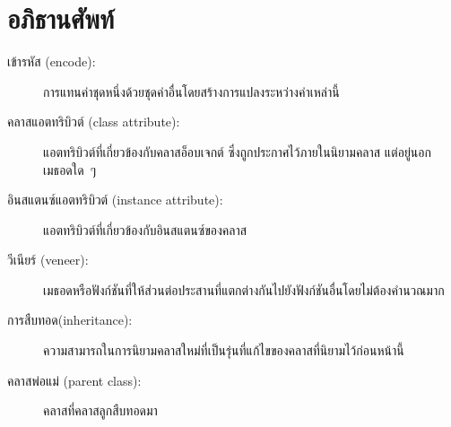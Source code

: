 \section{อภิธานศัพท์}

\begin{description}


\item[เข้ารหัส (encode):] การแทนค่าชุดหนึ่งด้วยชุดค่าอื่นโดยสร้างการแปลงระหว่างค่าเหล่านี้


\item[คลาสแอตทริบิวต์ (class attribute):] แอตทริบิวต์ที่เกี่ยวข้องกับคลาสอ็อบเจกต์ ซึ่งถูกประกาศไว้ภายในนิยามคลาส แต่อยู่นอกเมธอดใด~ๆ


\item[อินสแตนซ์แอตทริบิวต์ (instance attribute):] แอตทริบิวต์ที่เกี่ยวข้องกับอินสแตนซ์ของคลาส


\item[วีเนียร์ (veneer):] เมธอดหรือฟังก์ชันที่ให้ส่วนต่อประสานที่แตกต่างกันไปยังฟังก์ชันอื่นโดยไม่ต้องคำนวณมาก


\item[การสืบทอด(inheritance):] ความสามารถในการนิยามคลาสใหม่ที่เป็นรุ่นที่แก้ไขของคลาสที่นิยามไว้ก่อนหน้านี้ 


\item[คลาสพ่อแม่ (parent class):] คลาสที่คลาสลูกสืบทอดมา


\end{description}
